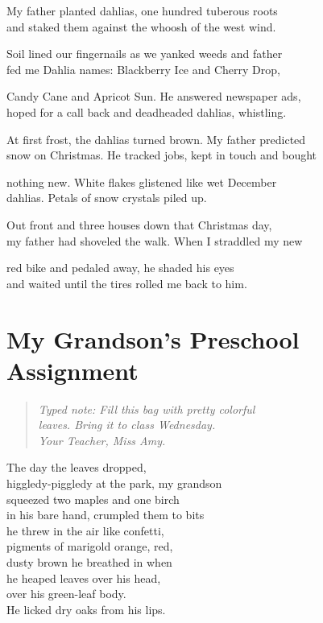 \documentclass[twoside,10pt]{book}
\begin{document}
My father planted dahlias, one hundred tuberous roots\\
and staked them against the whoosh of the west wind.

Soil lined our fingernails as we yanked weeds and father\\
fed me Dahlia names: Blackberry Ice and Cherry Drop,

Candy Cane and Apricot Sun. He answered newspaper ads,\\
hoped for a call back and deadheaded dahlias, whistling.

At first frost, the dahlias turned brown. My father predicted\\
snow on Christmas. He tracked jobs, kept in touch and bought

nothing new. White flakes glistened like wet December\\
dahlias. Petals of snow crystals piled up.

Out front and three houses down that Christmas day,\\
my father had shoveled the walk. When I straddled my new

red bike and pedaled away, he shaded his eyes\\
and waited until the tires rolled me back to him.


\clearpage
\section{My Grandson's Preschool Assignment}

\begin{quote}
\emph{Typed note: Fill this bag with pretty colorful\\
leaves. Bring it to class Wednesday.\\
Your Teacher, Miss Amy.}
\end{quote}

The day the leaves dropped,\\
higgledy-piggledy at the park, my grandson\\
squeezed two maples and one birch\\
in his bare hand, crumpled them to bits\\
he threw in the air like confetti,\\
pigments of marigold orange, red,\\
dusty brown he breathed in when\\
he heaped leaves over his head,\\
over his green-leaf body.\\
He licked dry oaks from his lips.
\end{document}
